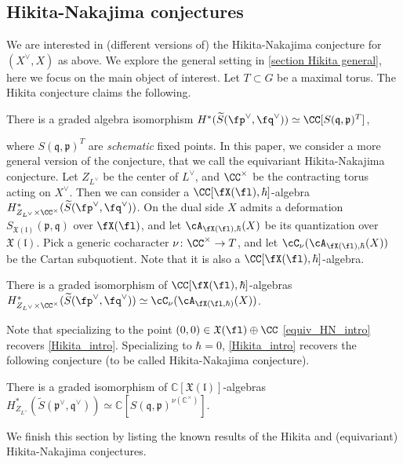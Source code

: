 \documentclass[12pt]{amsart}
\begin{document}
\subsection{Hikita-Nakajima conjectures}    We are interested in (different versions of) the Hikita-Nakajima conjecture for $(X^\vee, X)$ as above. We explore the general setting in \cref{section Hikita general}, here we focus on the main object of interest. Let $T\subset G$ be a maximal torus. The Hikita conjecture \cite{Hikita} claims the following.
    \begin{conj}\label{Hikita_intro}
        There is a graded algebra isomorphism $H^*(\widetilde{S}(\fp^\vee, \fq^\vee))\simeq \CC[S(\mathfrak{q},\mathfrak{p})^T]$,
    \end{conj}
    where $S(\mathfrak{q},\mathfrak{p})^T$ are \emph{schematic} fixed points.
    In this paper, we consider a more general version of the conjecture, that we call the equivariant Hikita-Nakajima conjecture. Let $Z_{L^\vee}$ be the center of $L^\vee$, and $\CC^\times$ be the contracting torus acting on $X^\vee$. Then we can consider a $\CC[\fX(\fl), \hbar]$-algebra $H_{Z_{L^\vee}\times \CC^\times}^* (\widetilde{S}(\fp^\vee, \fq^\vee))$. On the dual side $X$ admits a deformation $S_{\mathfrak{X}(\mathfrak{l})}(\mathfrak{p},\mathfrak{q})$ over $\fX(\fl)$, and let $\cA_{\fX(\fl), \hbar}(X)$ be its  quantization over $\mathfrak{X}(\mathfrak{l})$. Pick a generic cocharacter $\nu\colon \CC^\times \to T$, and let $\cC_{\nu}(\cA_{\fX(\fl), \hbar}(X))$ be the Cartan subquotient. Note that it is also a $\CC[\fX(\fl), \hbar]$-algebra. 
    \begin{conj}\label{equiv_HN_intro}
        There is a graded isomorphism of $\CC[\fX(\fl), \hbar]$-algebras $H_{Z_{L^\vee}\times \CC^\times}^* (\widetilde{S}(\fp^\vee, \fq^\vee))\simeq \cC_{\nu}(\cA_{\fX(\fl, \hbar)}(X))$.
    \end{conj}
    Note that specializing to the point $(0,0)\in \mathfrak{X}(\fl)\oplus \CC$ \cref{equiv_HN_intro} recovers \cref{Hikita_intro}. Specializing to $\hbar=0$,  \cref{Hikita_intro} recovers the following conjecture (to be called Hikita-Nakajima conjecture).
    \begin{conj}\label{HN_intro}
    There is a graded isomorphism of $\mathbb{C}[\mathfrak{X}(\mathfrak{l})]$-algebras $H^*_{Z_{L^\vee}}(\widetilde{S}(\mathfrak{p}^\vee,\mathfrak{q}^\vee)) \simeq \mathbb{C}[S(\mathfrak{q},\mathfrak{p})^{\nu(\mathbb{C}^\times)}]$.
    \end{conj}
    
    We finish this section by listing the known results of the Hikita and (equivariant) Hikita-Nakajima conjectures. 
    
\end{document}
